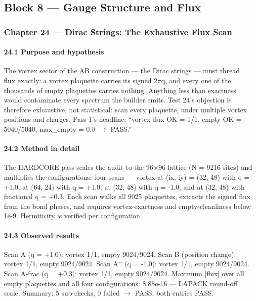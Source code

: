 \documentclass[10pt]{article}
\begin{document}
\subsection{Block 8 --- Gauge Structure and Flux}

\subsubsection{Chapter 24 --- Dirac Strings: The Exhaustive Flux Scan}

\paragraph{24.1 Purpose and hypothesis}

The vortex sector of the AB construction --- the Dirac strings --- must thread flux exactly: a vortex plaquette carries its signed 2$\pi$q, and every one of the thousands of empty plaquettes carries nothing. Anything less than exactness would contaminate every spectrum the builder emits. Test 24's objection is therefore exhaustive, not statistical: scan every plaquette, under multiple vortex positions and charges. Pass 1's headline: ``vortex flux OK = 1/1, empty OK = 5040/5040, max\_empty = 0.0 $\rightarrow$ PASS.''

\paragraph{24.2 Method in detail}

The HARDCORE pass scales the audit to the 96$\times$96 lattice (N = 9216 sites) and multiplies the configurations: four scans --- vortex at (ix, iy) = (32, 48) with q = +1.0; at (64, 24) with q = +1.0; at (32, 48) with q = -1.0; and at (32, 48) with fractional q = +0.3. Each scan walks all 9025 plaquettes, extracts the signed flux from the bond phases, and requires vortex-exactness and empty-cleanliness below 1e-9. Hermiticity is verified per configuration.

\paragraph{24.3 Observed results}

Scan A (q = +1.0): vortex 1/1, empty 9024/9024. Scan B (position change): vortex 1/1, empty 9024/9024. Scan A$^-$ (q = -1.0): vortex 1/1, empty 9024/9024. Scan A-frac (q = +0.3): vortex 1/1, empty 9024/9024. Maximum |flux| over all empty plaquettes and all four configurations: 8.88e-16 --- LAPACK round-off scale. Summary: 5 sub-checks, 0 failed $\rightarrow$ PASS; both entries PASS.
\end{document}
